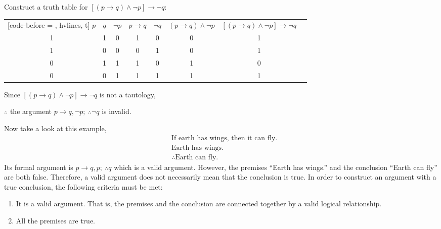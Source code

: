 \documentclass{report}
\newcounter{example}
\begin{document}
\begin{solution}
    \item Construct a truth table for $[(p \rightarrow q) \land \neg p] \rightarrow \neg
        q$:
    \begin{center}
        \begin{NiceTabular}{|c|c|c|c|c|c|c|c|}[code-before = , hvlines, t]
            $p$ & $q$ & $\neg p$ & $p \rightarrow q$ & $\neg q$ & $(p \rightarrow q) \land \neg p$ & $[(p \rightarrow q) \land \neg p] \rightarrow \neg q$ \\
            1   & 1   & 0        & 1                 & 0        & 0                                & 1                                                     \\
            1   & 0   & 0        & 0                 & 1        & 0                                & 1                                                     \\
            0   & 1   & 1        & 1                 & 0        & 1                                & 0                                                     \\
            0   & 0   & 1        & 1                 & 1        & 1                                & 1                                                     \\
        \end{NiceTabular}
    \end{center}
    Since $[(p \rightarrow q) \land \neg p] \rightarrow \neg q$ is not a tautology,

    $\therefore$ the argument $p \rightarrow q, \neg p;\ \therefore \neg q$ is invalid.
\end{solution}

Now take a look at this example,
\begin{align*}
     & \text{If earth has wings, then it can fly.} \\
     & \text{Earth has wings.}                     \\
     & \therefore \text{Earth can fly.}
\end{align*}
Its formal argument is $p \rightarrow q, p;\ \therefore q$ which is a valid argument. However, the premises ``Earth has wings.'' and the conclusion ``Earth can fly'' are both false. Therefore, a valid argument does not necessarily mean that the conclusion is true. In order to construct an argument with a true conclusion, the following criteria must be met:
\begin{enumerate}[leftmargin=*]
    \item It is a valid argument. That is, the premises and the conclusion are connected
          together by a valid logical relationship.
    \item All the premises are true.
\end{enumerate}
\end{document}
